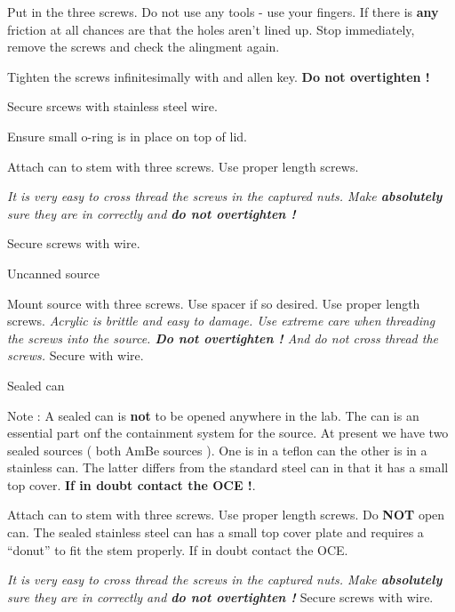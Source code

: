 \begin{enumerate}
\begin{enumerate}
 \checkitem Put in the three screws.  Do not use any tools - use your fingers. If there is {\bf any }
 friction at all chances are that the holes aren't lined up. Stop immediately, remove the screws and
 check the alingment again.

 \checkitem Tighten the screws infinitesimally with and allen key. {\bf Do not overtighten ! }

 \checkitem Secure srcews with stainless steel wire.

 \checkitem Ensure small o-ring is in place on top of lid. 

 \checkitem Attach can to stem with three screws. Use proper length screws. 

 \small
 { \em It is very easy to cross thread the screws in the captured nuts. Make {\bf absolutely} sure
 they are in correctly and { \bf do not overtighten ! } }

 \checkitem Secure screws with wire.
 \normalsize

 \end{enumerate}




\checkitem Uncanned source
 \begin{enumerate}
 \checkitem Mount source with three screws. Use spacer if so desired. Use proper length screws.
 \small
 {\em Acrylic is brittle and easy to damage. Use extreme care when threading the
 screws into the source. {\bf Do not overtighten !}  And do not cross thread the screws.  }
 \normalsize
 \checkitem Secure with wire.
 \end{enumerate}

\checkitem Sealed can

   Note : A sealed can is { \bf not } to be opened anywhere in the lab. The can is an essential
part onf the containment system for the source. At present we have two sealed sources ( both AmBe sources ).
One is in a teflon can the other is in a stainless can. The latter differs from the standard steel can
in that it has a small top cover. {\bf If in doubt contact the OCE !}.


 \begin{enumerate}
  
  \checkitem 
 \checkitem Attach can to stem with three screws. Use proper length screws. Do {\bf NOT } open can.
    The sealed stainless steel can has a small top cover plate and requires a ``donut''
    to fit the stem properly. If in doubt contact the OCE. 



 \small
 { \em It is very easy to cross thread the screws in the captured nuts. Make {\bf absolutely} sure
 they are in correctly and { \bf do not overtighten ! } }
 \normalsize
 \checkitem Secure screws with wire.
 \end{enumerate}




\end{enumerate}




